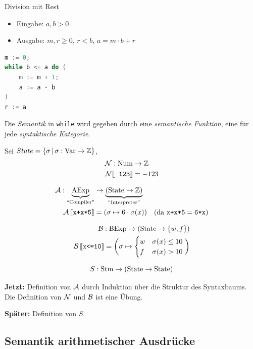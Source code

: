 \begin{example}
    Division mit Rest
    \begin{itemize}
        \item Eingabe: $a, b > 0$
        \item Ausgabe: $m ,r \geq 0$, $r < b$, $a = m \cdot b + r$
    \end{itemize}
\end{example}

\begin{lstlisting}[language=C, caption=Division mit Rest]
m := 0;
while b <= a do (
    m := m + 1;
    a := a - b
)
r := a
\end{lstlisting}

Die \emph{Semantik} in \texttt{while} wird gegeben durch eine \emph{semantische Funktion}, eine für jede \emph{syntaktische Kategorie}.

Sei $State = \{ \sigma \,\vert\, \sigma: \operatorname{Var} \to \mathbb{Z} \}$, \zb
\begin{align*}
    \mathcal{N} : \operatorname{Num} & \to \mathbb{Z} \\
    \mathcal{N}\mathrm{[}\kern-.14em\mathrm{[}\texttt{-123}\mathrm{]}\kern-.14em\mathrm{]} & = -123
\end{align*}

\begin{align*}
    \operatorname{\mathcal{A}}: \underbrace{\operatorname{AExp}}_{\text{``Compiler''}} & \to \underbrace{(\operatorname{State} \to \mathbb{Z})}_{\text{``Interpreter''}} \\
    \operatorname{\mathcal{A}}\mathrm{[}\kern-.14em\mathrm{[}\texttt{x+x*5}\mathrm{]}\kern-.14em\mathrm{]} & = (\sigma \mapsto 6 \cdot \sigma(x)) \quad (\text{da }\texttt{x+x*5} = \texttt{6*x})
\end{align*}

\begin{align*}
    \operatorname{\mathcal{B}} : \operatorname{BExp} \to (\operatorname{State} \to \{ w, f \}) \\
    \operatorname{\mathcal{B}}\mathrm{[}\kern-.14em\mathrm{[}\texttt{x<=10}\mathrm{]}\kern-.14em\mathrm{]} = \bigg( \sigma \mapsto \begin{cases}
        w & \sigma(x) \leq 10 \\
        f & \sigma(x) > 10
    \end{cases} \bigg)
\end{align*}

\[
S: \operatorname{Stm} \to (\operatorname{State} \to \operatorname{State})
\]

\textbf{Jetzt:} Definition von $\operatorname{\mathcal{A}}$ durch Induktion über die Struktur des Syntaxbaums. Die Definition von $\operatorname{\mathcal{N}}$ und $\operatorname{\mathcal{B}}$ ist eine Übung.

\textbf{Später:} Definition von $S$.



\subsection{Semantik arithmetischer Ausdrücke}

